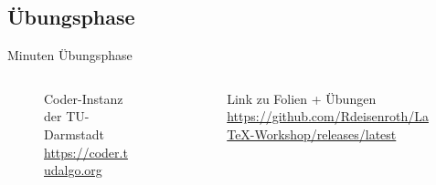 \documentclass[
    ngerman,
    accentcolor=3b,
    dark_mode,
    fontsize= 12pt,
    a4paper,
    aspectratio=169,
    colorback=true,
    fancy_row_colors,
    leqno,
    fleqn,
    boxarc=3pt,
    fleqn,
]{algoslides}
\begin{document}

    \subsection{Übungsphase}
    \begin{frame}[c]
        \slidehead{}
         Minuten Übungsphase
        \begin{columns}[c]
            \begin{column}{.5\textwidth}
                \begin{figure}
                    \centering
                    \caption{Coder-Instanz der TU-Darmstadt\\\url{https://coder.tudalgo.org}}
                \end{figure}
            \end{column}%
            \begin{column}{.5\textwidth}
                \begin{figure}
                    \centering
                    \caption{Link zu Folien + Übungen\\\url{https://github.com/Rdeisenroth/LaTeX-Workshop/releases/latest}}
                \end{figure}
            \end{column}
        \end{columns}
    \end{frame}
\end{document}

